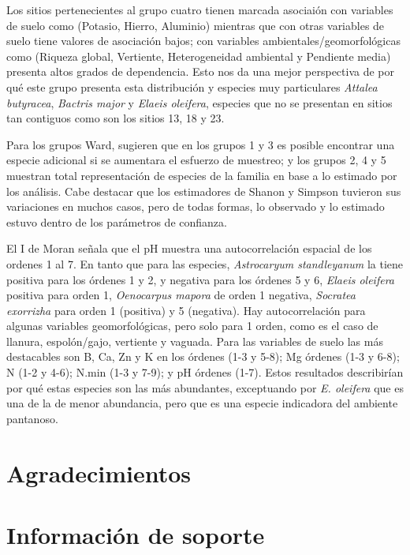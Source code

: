 \documentclass[11pt,]{article}
\begin{document}
Los sitios pertenecientes al grupo cuatro tienen marcada asociaión con
variables de suelo como (Potasio, Hierro, Aluminio) mientras que con
otras variables de suelo tiene valores de asociación bajos; con
variables ambientales/geomorfológicas como (Riqueza global, Vertiente,
Heterogeneidad ambiental y Pendiente media) presenta altos grados de
dependencia. Esto nos da una mejor perspectiva de por qué este grupo
presenta esta distribución y especies muy particulares \emph{Attalea
butyracea}, \emph{Bactris major} y \emph{Elaeis oleifera}, especies que
no se presentan en sitios tan contiguos como son los sitios 13, 18 y 23.

Para los grupos Ward, sugieren que en los grupos 1 y 3 es posible
encontrar una especie adicional si se aumentara el esfuerzo de muestreo;
y los grupos 2, 4 y 5 muestran total representación de especies de la
familia en base a lo estimado por los análisis. Cabe destacar que los
estimadores de Shanon y Simpson tuvieron sus variaciones en muchos
casos, pero de todas formas, lo observado y lo estimado estuvo dentro de
los parámetros de confianza.

El I de Moran señala que el pH muestra una autocorrelación espacial de
los ordenes 1 al 7. En tanto que para las especies, \emph{Astrocaryum
standleyanum} la tiene positiva para los órdenes 1 y 2, y negativa para
los órdenes 5 y 6, \emph{Elaeis oleifera} positiva para orden 1,
\emph{Oenocarpus mapora} de orden 1 negativa, \emph{Socratea exorrizha}
para orden 1 (positiva) y 5 (negativa). Hay autocorrelación para algunas
variables geomorfológicas, pero solo para 1 orden, como es el caso de
llanura, espolón/gajo, vertiente y vaguada. Para las variables de suelo
las más destacables son B, Ca, Zn y K en los órdenes (1-3 y 5-8); Mg
órdenes (1-3 y 6-8); N (1-2 y 4-6); N.min (1-3 y 7-9); y pH órdenes
(1-7). Estos resultados describirían por qué estas especies son las más
abundantes, exceptuando por \emph{E. oleifera} que es una de la de menor
abundancia, pero que es una especie indicadora del ambiente pantanoso.

\section{Agradecimientos}\label{agradecimientos}

\section{Información de soporte}\label{informaciuxf3n-de-soporte}
\end{document}
